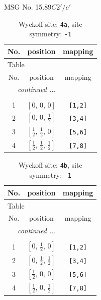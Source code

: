 \documentclass[fleqn,8pt]{jsarticle}
\begin{document}
\setcounter{MaxMatrixCols}{32}

\renewcommand{\tablename}{Table~}
\renewcommand{\figurename}{Figure~}
\begin{center}
\LARGE
MSG No. 15.89\quad$C2'/c'$
\end{center}
\renewcommand{\arraystretch}{1.2}
\begin{longtable}{ccc}
\caption{Wyckoff site: {\tt 4a}, site symmetry: {\tt -1}}
 \\
 \hline \hline
No. & position & mapping \\ \hline \endfirsthead

\multicolumn{2}{l}{\tablename\ \thetable{}} \\
 \hline \hline
No. & position & mapping \\ \hline \endhead

 \hline \hline
\multicolumn{2}{r}{\footnotesize\it continued ...} \\ \endfoot

 \hline \hline
\multicolumn{2}{r}{} \\ \endlastfoot

1 & $\left[ 0,\, 0,\, 0 \right]$ & {\tt [1,2]} \\ \hline
2 & $\left[ 0,\, 0,\, \frac{1}{2} \right]$ & {\tt [3,4]} \\ \hline
3 & $\left[ \frac{1}{2},\, \frac{1}{2},\, 0 \right]$ & {\tt [5,6]} \\ \hline
4 & $\left[ \frac{1}{2},\, \frac{1}{2},\, \frac{1}{2} \right]$ & {\tt [7,8]} \\
\end{longtable}
\renewcommand{\arraystretch}{1.2}
\begin{longtable}{ccc}
\caption{Wyckoff site: {\tt 4b}, site symmetry: {\tt -1}}
 \\
 \hline \hline
No. & position & mapping \\ \hline \endfirsthead

\multicolumn{2}{l}{\tablename\ \thetable{}} \\
 \hline \hline
No. & position & mapping \\ \hline \endhead

 \hline \hline
\multicolumn{2}{r}{\footnotesize\it continued ...} \\ \endfoot

 \hline \hline
\multicolumn{2}{r}{} \\ \endlastfoot

1 & $\left[ 0,\, \frac{1}{2},\, 0 \right]$ & {\tt [1,2]} \\ \hline
2 & $\left[ 0,\, \frac{1}{2},\, \frac{1}{2} \right]$ & {\tt [3,4]} \\ \hline
3 & $\left[ \frac{1}{2},\, 0,\, 0 \right]$ & {\tt [5,6]} \\ \hline
4 & $\left[ \frac{1}{2},\, 0,\, \frac{1}{2} \right]$ & {\tt [7,8]} \\
\end{longtable}
\end{document}
